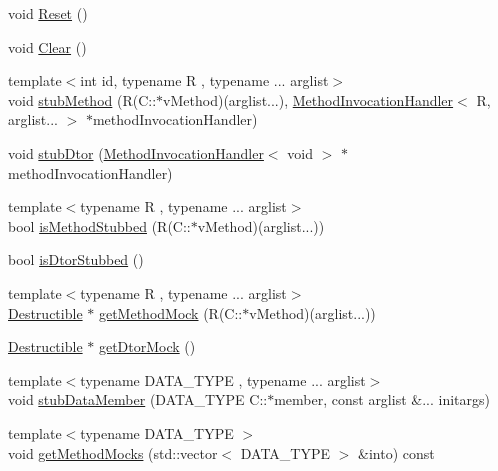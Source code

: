 \begin{DoxyCompactItemize}
void \mbox{\hyperlink{structfakeit_1_1DynamicProxy_a8f00dd7c68a247f715ec3925f662de9f}{Reset}} ()
\item 
void \mbox{\hyperlink{structfakeit_1_1DynamicProxy_a995c7e3dd97dc7707f18774eb4554b45}{Clear}} ()
\item 
{\footnotesize template$<$int id, typename R , typename ... arglist$>$ }\\void \mbox{\hyperlink{structfakeit_1_1DynamicProxy_ab1a98295698cf6eed3ff04ed4b838e51}{stub\+Method}} (R(C\+::$\ast$v\+Method)(arglist...), \mbox{\hyperlink{structfakeit_1_1MethodInvocationHandler}{Method\+Invocation\+Handler}}$<$ R, arglist... $>$ $\ast$method\+Invocation\+Handler)
\item 
void \mbox{\hyperlink{structfakeit_1_1DynamicProxy_a8ab5aa831398c6ee27cbdb12ee1f15cf}{stub\+Dtor}} (\mbox{\hyperlink{structfakeit_1_1MethodInvocationHandler}{Method\+Invocation\+Handler}}$<$ void $>$ $\ast$method\+Invocation\+Handler)
\item 
{\footnotesize template$<$typename R , typename ... arglist$>$ }\\bool \mbox{\hyperlink{structfakeit_1_1DynamicProxy_aeccdd2a03ebbf8eecc3291ebe6ccbfc4}{is\+Method\+Stubbed}} (R(C\+::$\ast$v\+Method)(arglist...))
\item 
bool \mbox{\hyperlink{structfakeit_1_1DynamicProxy_a6d3f0dfa93dc98b37fb50002bc4ea2bc}{is\+Dtor\+Stubbed}} ()
\item 
{\footnotesize template$<$typename R , typename ... arglist$>$ }\\\mbox{\hyperlink{classfakeit_1_1Destructible}{Destructible}} $\ast$ \mbox{\hyperlink{structfakeit_1_1DynamicProxy_a9774578f92b4d0258c72192dd16d6d0e}{get\+Method\+Mock}} (R(C\+::$\ast$v\+Method)(arglist...))
\item 
\mbox{\hyperlink{classfakeit_1_1Destructible}{Destructible}} $\ast$ \mbox{\hyperlink{structfakeit_1_1DynamicProxy_a32f8a09734ef6d70162d682fd593707b}{get\+Dtor\+Mock}} ()
\item 
{\footnotesize template$<$typename D\+A\+T\+A\+\_\+\+T\+Y\+PE , typename ... arglist$>$ }\\void \mbox{\hyperlink{structfakeit_1_1DynamicProxy_a872480e95dba48c6e690fb7cdc017f9d}{stub\+Data\+Member}} (D\+A\+T\+A\+\_\+\+T\+Y\+PE C\+::$\ast$member, const arglist \&... initargs)
\item 
{\footnotesize template$<$typename D\+A\+T\+A\+\_\+\+T\+Y\+PE $>$ }\\void \mbox{\hyperlink{structfakeit_1_1DynamicProxy_a21e8fdd6bcf64b2d7e0b86261529da35}{get\+Method\+Mocks}} (std\+::vector$<$ D\+A\+T\+A\+\_\+\+T\+Y\+PE $>$ \&into) const

\end{DoxyCompactItemize}
